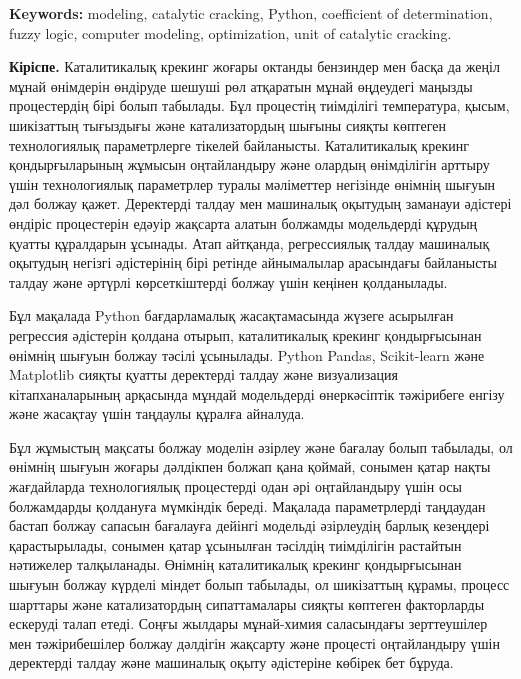 {\bfseries Keywords:} modeling, catalytic cracking, Python, coefficient of
determination, fuzzy logic, computer modeling, optimization, unit of
catalytic cracking.

{\bfseries Кіріспе.} Каталитикалық крекинг жоғары октанды бензиндер мен
басқа да жеңіл мұнай өнімдерін өндіруде шешуші рөл атқаратын мұнай
өңдеудегі маңызды процестердің бірі болып табылады. Бұл процестің
тиімділігі температура, қысым, шикізаттың тығыздығы және катализатордың
шығыны сияқты көптеген технологиялық параметрлерге тікелей байланысты.
Каталитикалық крекинг қондырғыларының жұмысын оңтайландыру және олардың
өнімділігін арттыру үшін технологиялық параметрлер туралы мәліметтер
негізінде өнімнің шығуын дәл болжау қажет. Деректерді талдау мен
машиналық оқытудың заманауи әдістері өндіріс процестерін едәуір жақсарта
алатын болжамды модельдерді құрудың қуатты құралдарын ұсынады. Атап
айтқанда, регрессиялық талдау машиналық оқытудың негізгі әдістерінің
бірі ретінде айнымалылар арасындағы байланысты талдау және әртүрлі
көрсеткіштерді болжау үшін кеңінен қолданылады.

Бұл мақалада Python бағдарламалық жасақтамасында жүзеге асырылған
регрессия әдістерін қолдана отырып, каталитикалық крекинг қондырғысынан
өнімнің шығуын болжау тәсілі ұсынылады. Python Pandas, Scikit-learn және
Matplotlib сияқты қуатты деректерді талдау және визуализация
кітапханаларының арқасында мұндай модельдерді өнеркәсіптік тәжірибеге
енгізу және жасақтау үшін таңдаулы құралға айналуда.

Бұл жұмыстың мақсаты болжау моделін әзірлеу және бағалау болып табылады,
ол өнімнің шығуын жоғары дәлдікпен болжап қана қоймай, сонымен қатар
нақты жағдайларда технологиялық процестерді одан әрі оңтайландыру үшін
осы болжамдарды қолдануға мүмкіндік береді. Мақалада параметрлерді
таңдаудан бастап болжау сапасын бағалауға дейінгі модельді әзірлеудің
барлық кезеңдері қарастырылады, сонымен қатар ұсынылған тәсілдің
тиімділігін растайтын нәтижелер талқыланады. Өнімнің каталитикалық
крекинг қондырғысынан шығуын болжау күрделі міндет болып табылады, ол
шикізаттың құрамы, процесс шарттары және катализатордың сипаттамалары
сияқты көптеген факторларды ескеруді талап етеді. Соңғы жылдары
мұнай-химия саласындағы зерттеушілер мен тәжірибешілер болжау дәлдігін
жақсарту және процесті оңтайландыру үшін деректерді талдау және
машиналық оқыту әдістеріне көбірек бет бұруда.

